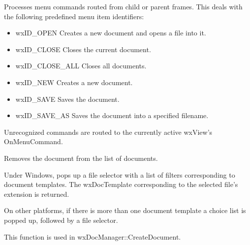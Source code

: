 
Processes menu commands routed from child or parent frames. This deals
with the following predefined menu item identifiers:

\begin{itemize}\itemsep=0pt
\item wxID\_OPEN Creates a new document and opens a file into it.
\item wxID\_CLOSE Closes the current document.
\item wxID\_CLOSE\_ALL Closes all documents.
\item wxID\_NEW Creates a new document.
\item wxID\_SAVE Saves the document.
\item wxID\_SAVE\_AS Saves the document into a specified filename.
\end{itemize}

Unrecognized commands are routed to the currently active wxView's OnMenuCommand.



Removes the document from the list of documents.



Under Windows, pops up a file selector with a list of filters corresponding to document templates.
The wxDocTemplate corresponding to the selected file's extension is returned.

On other platforms, if there is more than one document template a choice list is popped up,
followed by a file selector.

This function is used in wxDocManager::CreateDocument.





